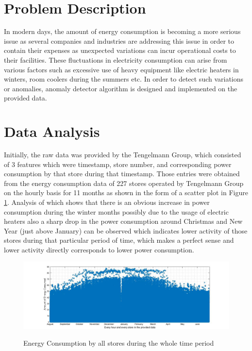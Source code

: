 \documentclass[12pt]{article}
\begin{document}
\maketitle


\section{Problem Description}
In modern days, the amount of energy consumption is becoming a more serious issue as several companies and industries are addressing this issue in order to contain their expenses as unexpected variations can incur operational costs to their facilities. These fluctuations in electricity consumption can arise from various factors such as excessive use of heavy equipment like electric heaters in winters, room coolers during the summers etc. In order to detect such variations or anomalies, anomaly detector algorithm is designed and implemented on the provided data.


\section{Data Analysis}
\label{Data}
Initially, the raw data was provided by the Tengelmann Group, which consisted of 3 features which were timestamp, store number, and corresponding power consumption by that store during that timestamp. 
Those entries were obtained from the energy consumption data of 227 stores operated by Tengelmann Group on the hourly basis for 11 months as shown in the form of a scatter plot in Figure \ref{100blockdiag}. Analysis of which shows that there is an obvious increase in power consumption during the winter months possibly due to the usage of electric heaters also a sharp drop in the power consumption around Christmas and New Year (just above January) can be observed which indicates lower activity of those stores during that particular period of time, which makes a perfect sense and lower activity directly corresponds to lower power consumption.

\begin{figure}[H]
	\centering
	{\includegraphics[scale=0.33]{All_year.jpg}\label{100blockdiag}
	}
	\caption[The Block Diagram of the designed application]{Energy Consumption by all stores during the whole time period}
	\label{100blockdiag}
	\hspace{0.7cm}%
\end{figure}
 
\end{document}
